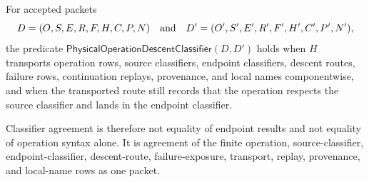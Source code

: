 \begin{definition}
\label{def:physical-operation-descent-classifier}
For accepted packets
$$
D=(O,S,E,R,F,H,C,P,N)
\quad\hbox{and}\quad
D'=(O',S',E',R',F',H',C',P',N'),
$$
the predicate $\mathsf{PhysicalOperationDescentClassifier}(D,D')$ holds when $H$ transports operation rows, source classifiers, endpoint classifiers, descent routes, failure rows, continuation replays, provenance, and local names componentwise, and when the transported route still records that the operation respects the source classifier and lands in the endpoint classifier.

Classifier agreement is therefore not equality of endpoint results and not equality of operation syntax alone. It is agreement of the finite operation, source-classifier, endpoint-classifier, descent-route, failure-exposure, transport, replay, provenance, and local-name rows as one packet.
\end{definition}

